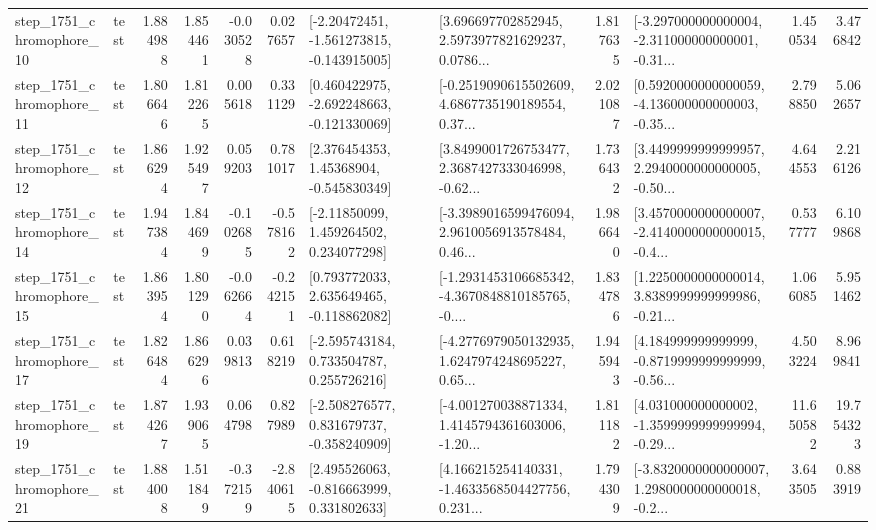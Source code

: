 \begin{tabular}{llrrrrllrlrr}
 step\_1751\_chromophore\_10 &      test &      1.884988 &    1.854461 &     -0.030528 &  0.027657 &   [-2.20472451, -1.561273815, -0.143915005] &  [3.696697702852945, 2.5973977821629237, 0.0786... &       1.817635 &  [-3.297000000000004, -2.311000000000001, -0.31... &            1.450534 &          3.476842 \\
 step\_1751\_chromophore\_11 &      test &      1.806646 &    1.812265 &      0.005618 &  0.331129 &   [0.460422975, -2.692248663, -0.121330069] &  [-0.2519090615502609, 4.6867735190189554, 0.37... &       2.021087 &  [0.5920000000000059, -4.136000000000003, -0.35... &            2.798850 &          5.062657 \\
 step\_1751\_chromophore\_12 &      test &      1.866294 &    1.925497 &      0.059203 &  0.781017 &     [2.376454353, 1.45368904, -0.545830349] &  [3.8499001726753477, 2.3687427333046998, -0.62... &       1.736432 &  [3.4499999999999957, 2.2940000000000005, -0.50... &            4.644553 &          2.216126 \\
 step\_1751\_chromophore\_14 &      test &      1.947384 &    1.844699 &     -0.102685 & -0.578162 &     [-2.11850099, 1.459264502, 0.234077298] &  [-3.3989016599476094, 2.9610056913578484, 0.46... &       1.986640 &  [3.4570000000000007, -2.4140000000000015, -0.4... &            0.537777 &          6.109868 \\
 step\_1751\_chromophore\_15 &      test &      1.863954 &    1.801290 &     -0.062664 & -0.242151 &    [0.793772033, 2.635649465, -0.118862082] &  [-1.2931453106685342, -4.3670848810185765, -0.... &       1.834786 &  [1.2250000000000014, 3.8389999999999986, -0.21... &            1.066085 &          5.951462 \\
 step\_1751\_chromophore\_17 &      test &      1.826484 &    1.866296 &      0.039813 &  0.618219 &    [-2.595743184, 0.733504787, 0.255726216] &  [-4.2776979050132935, 1.6247974248695227, 0.65... &       1.945943 &  [4.184999999999999, -0.8719999999999999, -0.56... &            4.503224 &          8.969841 \\
 step\_1751\_chromophore\_19 &      test &      1.874267 &    1.939065 &      0.064798 &  0.827989 &   [-2.508276577, 0.831679737, -0.358240909] &  [-4.001270038871334, 1.4145794361603006, -1.20... &       1.811182 &  [4.031000000000002, -1.3599999999999994, -0.29... &           11.650582 &         19.754323 \\
 step\_1751\_chromophore\_21 &      test &      1.884008 &    1.511849 &     -0.372159 & -2.840615 &    [2.495526063, -0.816663999, 0.331802633] &  [4.166215254140331, -1.4633568504427756, 0.231... &       1.794309 &  [-3.8320000000000007, 1.2980000000000018, -0.2... &            3.643505 &          0.883919 \\

\end{tabular}
